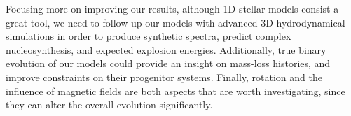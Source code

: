 \documentclass[../../main/thesis_msc.tex]{subfiles}
\begin{document}
		
		Focusing more on improving our results, although 1D stellar models consist a great tool, we need to follow-up our models with advanced 3D hydrodynamical simulations in order to produce synthetic spectra, predict complex nucleosynthesis, and expected explosion energies.
		Additionally, true binary evolution of our models could provide an insight on mass-loss histories, and improve constraints on their progenitor systems. Finally, rotation and the influence of magnetic fields are both aspects that are worth investigating, since they can alter the overall evolution significantly.
		
		
\end{document}
